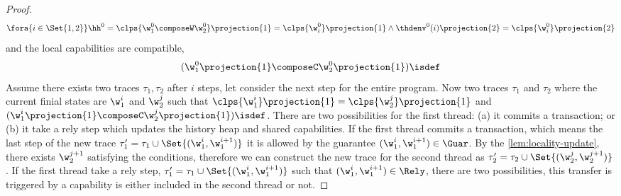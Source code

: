 \begin{proof}
\[ 
    \fora{i \in \Set{1,2}} 
    \hh^{0} = \clps{\w_{1}^{0} \composeW \w_{2}^{0}}\projection{1} = \clps{\w_{i}^{0}}\projection{1}
    \land \thdenv^{0}(i)\projection{2} = \clps{\w_{i}^{0}}\projection{2}
\]
and the local capabilities are compatible,
\[ 
    (\w_{1}^{0}\projection{1} \composeC \w_{2}^{0}\projection{1})\isdef 
\]
Assume there exists two traces \( \tau_{1}, \tau_{2}\) after \( i \) steps, let consider the next step for the entire program.
Now two traces \( \tau_{1}\) and \( \tau_{2} \) where the current finial states are \( \w_{1}^{i} \) and \( \w_{2}^{j} \) such that \( \clps{\w_{1}^{i}}\projection{1} = \clps{\w_{2}^{j}}\projection{1} \) and \( (\w_{1}^{i}\projection{1} \composeC \w_{2}^{j}\projection{1})\isdef \).
There are two possibilities for the first thread: (a) it commits a transaction; or (b) it take a rely step which updates the history heap and shared capabilities.
If the first thread commits a transaction, which means the last step of the new trace \( \tau_{1}' = \tau_{1} \cup \Set{(\w_{1}^{i}, \w_{1}^{i+1})} \) it is allowed by the guarantee \( (\w_{1}^{i}, \w_{1}^{i+1}) \in \Guar \).
By the \cref{lem:locality-update}, there exists \( \w_{2}^{j+1} \) satisfying the conditions, therefore we can construct the new trace for the second thread as \( \tau_{2}' = \tau_{2} \cup \Set{(\w_{2}^{j},\w_{2}^{j+1})} \).
If the first thread take a rely step, \ie \( \tau_{1}' = \tau_{1} \cup \Set{(\w_{1}^{i}, \w_{1}^{i+1})} \) such that \( (\w_{1}^{i}, \w_{1}^{i+1}) \in \Rely \), there are two possibilities, this transfer is triggered by a capability is either included in the second thread or not.

\end{proof}
